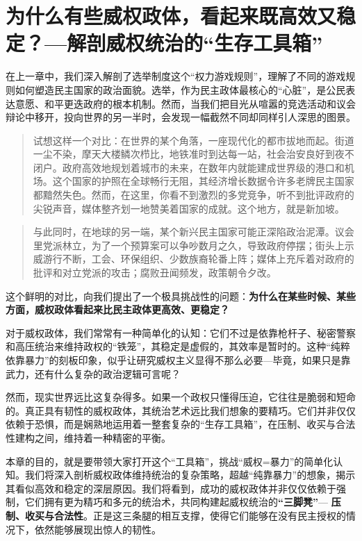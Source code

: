 

\chapter{为什么有些威权政体，看起来既高效又稳定？---解剖威权统治的“生存工具箱”}

在上一章中，我们深入解剖了选举制度这个“权力游戏规则”，理解了不同的游戏规则如何塑造民主国家的政治面貌。选举，作为民主政体最核心的“心脏”，是公民表达意愿、和平更迭政府的根本机制。然而，当我们把目光从喧嚣的竞选活动和议会辩论中移开，投向世界的另一半时，会发现一幅截然不同却同样引人深思的图景。

\begin{quote}
试想这样一个对比：在世界的某个角落，一座现代化的都市拔地而起。街道一尘不染，摩天大楼鳞次栉比，地铁准时到达每一站，社会治安良好到夜不闭户。政府高效地规划着城市的未来，在数年内就能建成世界级的港口和机场。这个国家的护照在全球畅行无阻，其经济增长数据令许多老牌民主国家都黯然失色。然而，在这里，你看不到激烈的多党竞争，听不到批评政府的尖锐声音，媒体整齐划一地赞美着国家的成就。这个地方，就是新加坡。
\end{quote}

\begin{quote}
与此同时，在地球的另一端，某个新兴民主国家可能正深陷政治泥潭。议会里党派林立，为了一个预算案可以争吵数月之久，导致政府停摆；街头上示威游行不断，工会、环保组织、少数族裔轮番上阵；媒体上充斥着对政府的批评和对立党派的攻击；腐败丑闻频发，政策朝令夕改。
\end{quote}

这个鲜明的对比，向我们提出了一个极具挑战性的问题：\textbf{为什么在某些时候、某些方面，威权政体看起来比民主政体更高效、更稳定？}

对于威权政体，我们常常有一种简单化的认知：它们不过是依靠枪杆子、秘密警察和高压统治来维持政权的“铁笼”，其稳定是虚假的，其效率是暂时的。这种“纯粹依靠暴力”的刻板印象，似乎让研究威权主义显得不那么必要---毕竟，如果只是靠武力，还有什么复杂的政治逻辑可言呢？

然而，现实世界远比这复杂得多。如果一个政权只懂得压迫，它往往是脆弱和短命的。真正具有韧性的威权政体，其统治艺术远比我们想象的要精巧。它们并非仅仅依赖于恐惧，而是娴熟地运用着一整套复杂的“生存工具箱”，在压制、收买与合法性建构之间，维持着一种精密的平衡。

本章的目的，就是要带领大家打开这个“工具箱”，挑战“威权=暴力”的简单化认知。我们将深入剖析威权政体维持统治的复杂策略，超越“纯靠暴力”的想象，揭示其看似高效和稳定的深层原因。我们将看到，成功的威权政体并非仅仅依赖于强制，它们拥有更为精巧和多元的统治术，共同构建起威权统治的\textbf{“三脚凳”}--- \textbf{压制、收买与合法性}。正是这三条腿的相互支撑，使得它们能够在没有民主授权的情况下，依然能够展现出惊人的韧性。

